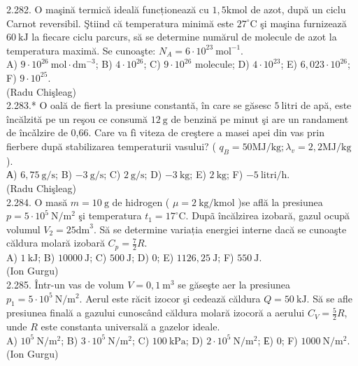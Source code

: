 2.282. O maşină termică ideală funcționează cu $1,5 \mathrm{kmol}$ de azot, după un ciclu Carnot reversibil. Ştiind că temperatura minimă este $27^{\circ} \mathrm{C}$ şi maşina furnizează $60 \mathrm{~kJ}$ la fiecare ciclu parcurs, să se determine numărul de molecule de azot la temperatura maximă. Se cunoaşte: $N_{A}=6 \cdot 10^{23} \mathrm{~mol}^{-1}$.\\ A) $9 \cdot 10^{26} \mathrm{~mol} \cdot \mathrm{dm}^{-3}$; B) $4 \cdot 10^{26}$; C) $9 \cdot 10^{26}$ molecule; D) $4 \cdot 10^{23}$; E) $6,023 \cdot 10^{26}$; F) $9 \cdot 10^{25}$.\\ (Radu Chişleag)\\

2.283.* O oală de fiert la presiune constantă, în care se găsesc $5 \mathrm{~litri}$ de apă, este încălzită pe un reşou ce consumă $12 \mathrm{~g}$ de benzină pe minut şi are un randament de încǎlzire de 0,66. Care va fì viteza de creştere a masei apei din vas prin fierbere după stabilizarea temperaturii vasului? ( $q_{B}=50 \mathrm{MJ} / \mathrm{kg} ; \lambda_{v}=2,2 \mathrm{MJ} / \mathrm{kg}$ ).\\ А) $6,75 \mathrm{~g} / \mathrm{s}$; B) $-3 \mathrm{~g} / \mathrm{s}$; C) $2 \mathrm{~g} / \mathrm{s}$; D) $-3 \mathrm{~kg}$; E) $2 \mathrm{~kg}$; F) $-5 \mathrm{~litri} / \mathrm{h}$.\\ (Radu Chişleag)\\

2.284. O masă $m=10 \mathrm{~g}$ de hidrogen ( $\mu=2 \mathrm{~kg} / \mathrm{kmol}$ )se află la presiunea $p=5 \cdot 10^{5} \mathrm{~N} / \mathrm{m}^{2}$ şi temperatura $t_{1}=17^{\circ} \mathrm{C}$. Dupã încălzirea izobară, gazul ocupă volumul $V_{2}=25 \mathrm{dm}^{3}$. Să se determine variația energiei interne dacă se cunoaşte căldura molară izobară $C_{p}=\frac{7}{2} R$.\\ A) $1 \mathrm{~kJ}$; B) $10000 \mathrm{~J}$; C) $500 \mathrm{~J}$; D) 0; E) $1126,25 \mathrm{~J}$; F) $550 \mathrm{~J}$.\\ (Ion Gurgu)\\

2.285. Într-un vas de volum $V=0,1 \mathrm{~m}^{3}$ se găseşte aer la presiunea $p_{1}=5 \cdot 10^{5} \mathrm{~N} / \mathrm{m}^{2}$. Aerul este răcit izocor şi cedează căldura $Q=50 \mathrm{~kJ}$. Să se afle presiunea finală a gazului cunoscând căldura molară izocoră a aerului $C_{V}=\frac{5}{2} R$, unde $R$ este constanta universală a gazelor ideale.\\ A) $10^{5} \mathrm{~N} / \mathrm{m}^{2}$; B) $3 \cdot 10^{5} \mathrm{~N} / \mathrm{m}^{2}$; C) $100 \mathrm{~kPa}$; D) $2 \cdot 10^{5} \mathrm{~N} / \mathrm{m}^{2}$; Е) 0; F) $1000 \mathrm{~N} / \mathrm{m}^{2}$.\\ (Ion Gurgu)\\

